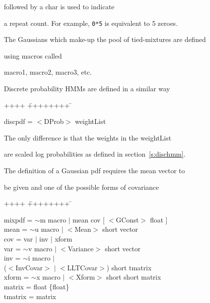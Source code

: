 followed by a {\sf char} is used to indicate


a repeat count.  For example, {\tt 0*5} is equivalent to 5 zeroes.


The Gaussians which make-up the pool of tied-mixtures are defined 


using   macros called


{\sf macro1}, {\sf macro2}, {\sf macro3}, etc. 





Discrete probability HMMs are defined in a similar way


{\sf


\begin{tabbing}


++++ \= ++++++++ \=  \kill


\>   discpdf = \> $<$DProb$>$ weightList


\end{tabbing}


}


\noindent


The only difference is that the weights in the \textsf{weightList}


are scaled log probabilities as defined in section~\ref{s:dischmm}.





The definition of a Gaussian pdf requires the mean vector to 


be given and one of the possible forms of covariance 


{\sf


\begin{tabbing}


++++ \= ++++++++ \=  \kill


\>   mixpdf = \> $\sim$m macro $|$ mean cov [ $<$GConst$>$ float ] \\


\>   mean = \> $\sim$u macro $|$ $<$Mean$>$ short vector \\


\>   cov =  \> var $|$ inv $|$ xform \\


\>   var = \> $\sim$v macro $|$ $<$Variance$>$ short vector \\


\>   inv = \> $\sim$i macro $|$ \\


\>        \> ($<$InvCovar$>$ $|$ $<$LLTCovar$>$) short tmatrix \\


\>   xform = \> $\sim$x macro $|$ $<$Xform$>$ short short matrix \\


\>   matrix = \> float \{float\} \\


\>   tmatrix = \> matrix \\


\end{tabbing}


}


